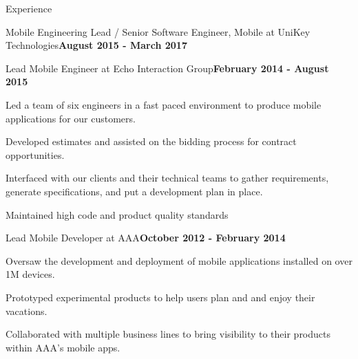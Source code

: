 \documentclass{resume} %
\begin{document}
\begin{rSection}{Experience}
\begin{rSubsection}{Mobile Engineering Lead / Senior Software Engineer, Mobile at UniKey Technologies}{\bf August 2015 - March 2017}{}{}
\end{rSubsection}


\begin{rSubsection}{Lead Mobile Engineer at Echo Interaction Group}{\bf February 2014 - August 2015}{}{}

\item Led a team of six engineers in a fast paced environment to produce mobile applications for our customers.
\item Developed estimates and assisted on the bidding process for contract opportunities.
\item Interfaced with our clients and their technical teams to gather requirements, generate specifications, and put a development plan in place.
\item Maintained high code and product quality standards 


\end{rSubsection}


\begin{rSubsection}{Lead Mobile Developer at AAA}{\bf October 2012 - February 2014}{}{}

\item Oversaw the development and deployment of mobile applications installed on over 1M devices.
\item Prototyped experimental products to help users plan and and enjoy their vacations.
\item Collaborated with multiple business lines to bring visibility to their products within AAA's mobile apps.

\end{rSubsection}


\end{rSection}

\end{document}
